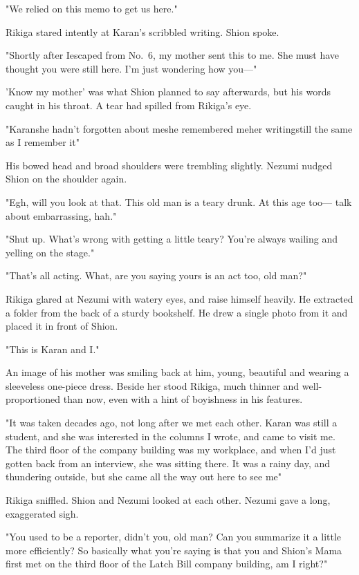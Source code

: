 "We relied on this memo to get us here."

Rikiga stared intently at Karan's scribbled writing. Shion spoke.

"Shortly after I\el escaped from No.~6, my mother sent this to me. She
must have thought you were still here. I'm just wondering how you---"

'Know my mother' was what Shion planned to say afterwards, but his words
caught in his throat. A tear had spilled from Rikiga's eye.

"Karan\el she hadn't forgotten about me\el she remembered me\el her
writing\el still the same as I remember it\el "

His bowed head and broad shoulders were trembling slightly. Nezumi
nudged Shion on the shoulder again.

"Egh, will you look at that. This old man is a teary drunk. At this age
too--- talk about embarrassing, hah."

"Shut up. What's wrong with getting a little teary? You're always
wailing and yelling on the stage."

"That's all acting. What, are you saying yours is an act too, old man?"

Rikiga glared at Nezumi with watery eyes, and raise himself heavily. He
extracted a folder from the back of a sturdy bookshelf. He drew a single
photo from it and placed it in front of Shion.

"This is Karan and I."

An image of his mother was smiling back at him, young, beautiful and
wearing a sleeveless one-piece dress. Beside her stood Rikiga, much
thinner and well-proportioned than now, even with a hint of boyishness
in his features.

"It was taken decades ago, not long after we met each other. Karan was
still a student, and she was interested in the columns I wrote, and came
to visit me. The third floor of the company building was my workplace,
and when I'd just gotten back from an interview, she was sitting there.
It was a rainy day, and thundering outside, but she came all the way out
here to see me\el "

Rikiga sniffled. Shion and Nezumi looked at each other. Nezumi gave a
long, exaggerated sigh.

"You used to be a reporter, didn't you, old man? Can you summarize it a
little more efficiently? So basically what you're saying is that you and
Shion's Mama first met on the third floor of the Latch Bill company
building, am I right?"

